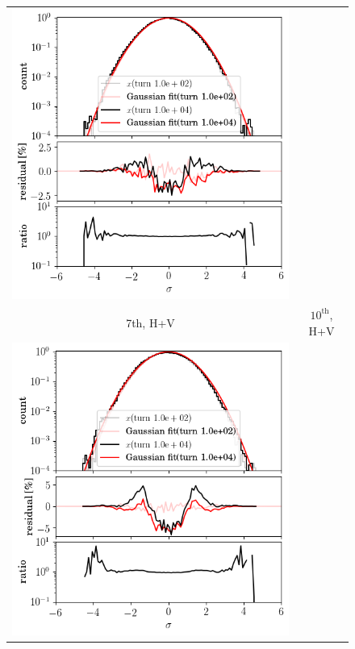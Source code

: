 \documentclass[%
 reprint,
 amsmath,amssymb,
 aps,
prstab,
longbibliography
]{revtex4-1}
\newlength{\halfwidth}
\begin{document}
\begin{figure}
\begin{tabular}{cc}
    \includegraphics[width=\halfwidth]{2016injerra2b2u_ranhv_3_5um_hist_x.png} \\
    7th, H+V & $10^{\mathrm{th}}$, H+V \\
    \includegraphics[width=\halfwidth]{2016injerra2b2u_t7skhv_3_5um_hist_x.png}

\end{tabular}
\end{figure}
\end{document}
